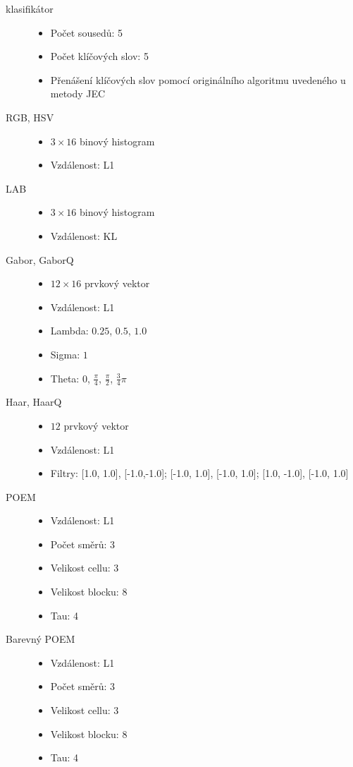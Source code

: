 \documentclass[czech,BP]{thesiskiv}
\begin{document}
\begin{description}
	\item[klasifikátor] \hfill 
		\begin{itemize}	
			\item Počet sousedů: 5
			\item Počet klíčových slov: 5
			\item Přenášení klíčových slov pomocí originálního algoritmu uvedeného u metody JEC
		\end{itemize}
	\item[RGB, HSV] \hfill 
		\begin{itemize} 
			\item $3\times 16$ binový histogram
			\item Vzdálenost: L1 	
		\end{itemize}
	\item[LAB] \hfill 
		\begin{itemize} 
			\item $3\times 16$ binový histogram
			\item Vzdálenost: KL 	
		\end{itemize}		
	\item[Gabor, GaborQ] \hfill 
		\begin{itemize} 
			\item $12 \times 16$ prvkový vektor
			\item Vzdálenost: L1 
			\item Lambda: $0.25$, $0.5$, $1.0$ 
			\item Sigma: $1$
			\item Theta: $0$, $\frac{\pi}{4}$, $\frac{\pi}{2}$, $\frac{3}{4}\pi$  	
		\end{itemize}
	\item[Haar, HaarQ] \hfill 
		\begin{itemize} 
			\item $12$ prvkový vektor
			\item Vzdálenost: L1 
			\item Filtry: [1.0, 1.0], [-1.0,-1.0]; [-1.0, 1.0], [-1.0, 1.0]; [1.0, -1.0], [-1.0, 1.0]  	
		\end{itemize}
	\item[POEM] \hfill 
		\begin{itemize} 		
			\item Vzdálenost: L1
			\item Počet směrů: 3
			\item Velikost cellu: 3
			\item Velikost blocku: 8
			\item Tau: 4 	
		\end{itemize}
	\item[Barevný POEM] \hfill 
		\begin{itemize} 
			\item Vzdálenost: L1 
			\item Počet směrů: 3
			\item Velikost cellu: 3
			\item Velikost blocku: 8
			\item Tau: 4  	
		\end{itemize}
\end{description}
\end{document}
